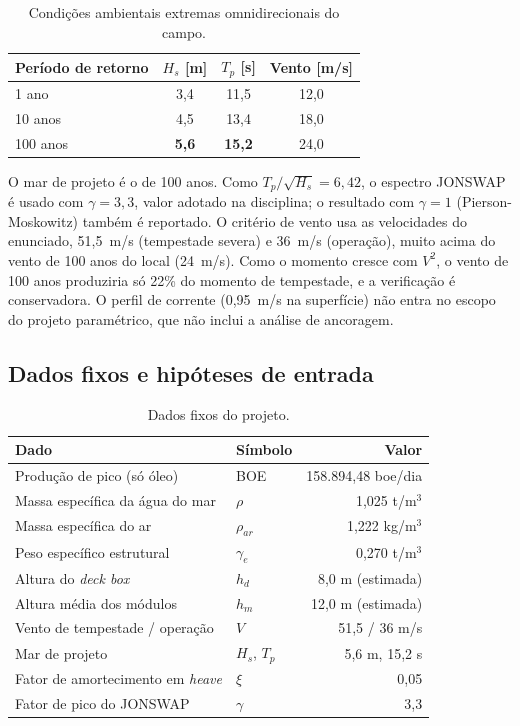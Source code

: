 \documentclass[11pt,a4paper]{article}
\begin{document}
\begin{table}[H]
\centering
\caption{Condições ambientais extremas omnidirecionais do campo.}\label{tab:ambiente}
\begin{tabular}{lccc}
\toprule
Período de retorno & $H_s$ [m] & $T_p$ [s] & Vento [m/s] \\
\midrule
1 ano   & 3,4 & 11,5 & 12,0 \\
10 anos & 4,5 & 13,4 & 18,0 \\
100 anos & \textbf{5,6} & \textbf{15,2} & 24,0 \\
\bottomrule
\end{tabular}
\end{table}

O mar de projeto é o de 100 anos. Como $T_p/\sqrt{H_s} = 6{,}42$, o espectro JONSWAP é usado
com $\gamma = 3{,}3$, valor adotado na disciplina; o resultado com $\gamma = 1$
(Pierson-Moskowitz) também é reportado. O critério de vento usa as velocidades do enunciado,
51,5~m/s (tempestade severa) e 36~m/s (operação), muito acima do vento de 100 anos do local
(24~m/s). Como o momento cresce com $V^2$, o vento de 100 anos produziria só 22\% do momento de
tempestade, e a verificação é conservadora. O perfil de corrente (0,95~m/s na superfície) não
entra no escopo do projeto paramétrico, que não inclui a análise de ancoragem.

\subsection{Dados fixos e hipóteses de entrada}

\begin{table}[H]
\centering
\caption{Dados fixos do projeto.}\label{tab:fixos}
\begin{tabular}{llr}
\toprule
Dado & Símbolo & Valor \\
\midrule
Produção de pico (só óleo) & BOE & 158.894,48 boe/dia \\
Massa específica da água do mar & $\rho$ & 1,025 t/m$^3$ \\
Massa específica do ar & $\rho_{ar}$ & 1,222 kg/m$^3$ \\
Peso específico estrutural & $\gamma_e$ & 0,270 t/m$^3$ \\
Altura do \emph{deck box} & $h_d$ & 8,0 m (estimada) \\
Altura média dos módulos & $h_m$ & 12,0 m (estimada) \\
Vento de tempestade / operação & $V$ & 51,5 / 36 m/s \\
Mar de projeto & $H_s$, $T_p$ & 5,6 m, 15,2 s \\
Fator de amortecimento em \emph{heave} & $\xi$ & 0,05 \\
Fator de pico do JONSWAP & $\gamma$ & 3,3 \\
\bottomrule
\end{tabular}
\end{table}
\end{document}
